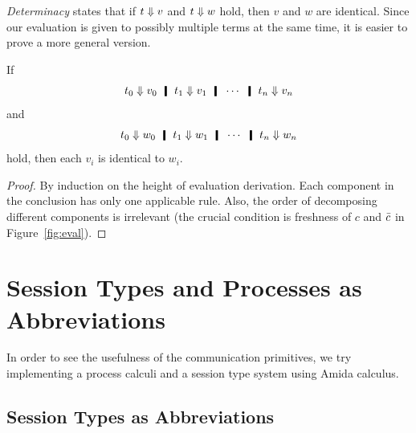   \textit{Determinacy}
  states that if $t\Downarrow v$ and $t\Downarrow w$ hold,
  then $v$ and $w$ are identical.
  Since our evaluation is given to possibly multiple terms at the same
  time, it is easier to prove a more general version.
  \begin{theorem}
   If
   \[
    t_0\eval v_0\hmid t_1\eval v_1\hmid \cdots \hmid t_n\eval v_n
   \]
   and
   \[
    t_0\eval w_0\hmid t_1\eval w_1\hmid \cdots \hmid t_n\eval w_n
   \]
   hold, then each $v_i$ is identical to $w_i$.
  \end{theorem}
  \begin{proof}
   By induction on the height of evaluation derivation.
   Each component in the conclusion has only one applicable rule.
   Also, the order of decomposing different components is irrelevant
   (the crucial
   condition is freshness of $c$ and $\bar{c}$ in Figure~\ref{fig:eval}).
  \end{proof}

  \section{Session Types and Processes as Abbreviations}
  \label{sec:session-process}

    In order to see the usefulness of the communication primitives,
    we try implementing a process calculi and a session type system
    using Amida calculus.

    \subsection{Session Types as Abbreviations}

